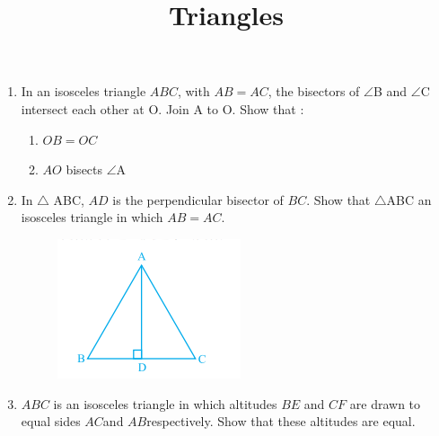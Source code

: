 \documentclass[12pt]{article}
\begin{document}
\title{\textbf{Triangles}}
\maketitle
\begin{center}
\end{center}
\fi
\begin{enumerate}
\item In an isosceles triangle $ABC$, with $AB = AC$, the bisectors of $\angle$B and $\angle$C intersect each other at O. Join A to O. Show that :
\begin{enumerate}
	\item $OB = OC$  
	\item $AO$ bisects $\angle$A
\end{enumerate}
\item In $\triangle$ ABC, $AD$ is the perpendicular bisector of $BC$. Show that $\triangle$ABC an isosceles triangle in which $AB = AC$.
\begin{figure}[!h]
\begin{center}
\includegraphics[width=\columnwidth]{exemplar/9.7.2/figs/triangle2.png}
\end{center}                                      \caption{}                                        \label{fig:exemplar/9.7.2/Fig1}                                  \end{figure}
\item $ABC$ is an isosceles triangle in which altitudes $BE$ and $CF $ are drawn to equal sides $AC $and $AB$respectively. Show that these altitudes are equal.
\begin{figure}[!h]

\end{figure}
\end{enumerate}
\end{document}

